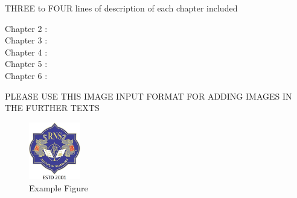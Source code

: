 THREE to FOUR lines of description of each chapter included
\begin{description}
	\item[Chapter 2 :] 
	\item[Chapter 3 :] 
	\item[Chapter 4 :]
	\item[Chapter 5 :]
	\item[Chapter 6 :]
\end{description}



PLEASE USE THIS IMAGE INPUT FORMAT FOR ADDING IMAGES IN THE FURTHER TEXTS

\begin{figure}[h]
	\centering
	\includegraphics[height=2.5cm]{images/rns1.jpg}
	\caption{Example Figure}
	\label{1}
\end{figure}


